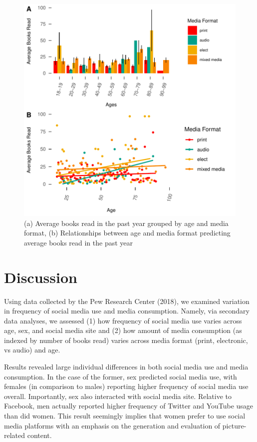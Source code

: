 \documentclass[man, fleqn, noextraspace]{apa6}
\theoremstyle{definition}
\theoremstyle{definition}
\theoremstyle{definition}
\theoremstyle{remark}
\begin{document}
\begin{figure}
\centering
\includegraphics{final_manuscript_files/figure-latex/fig4-1.pdf}
\caption{\label{fig:fig4}(a) Average books read in the past year grouped by
age and media format, (b) Relationships between age and media format
predicting average books read in the past year}
\end{figure}

\section{Discussion}\label{discussion}

Using data collected by the Pew Research Center (2018), we examined
variation in frequency of social media use and media consumption.
Namely, via secondary data analyses, we assessed (1) how frequency of
social media use varies across age, sex, and social media site and (2)
how amount of media consumption (as indexed by number of books read)
varies across media format (print, electronic, vs audio) and age.

Results revealed large individual differences in both social media use
and media consumption. In the case of the former, sex predicted social
media use, with females (in comparison to males) reporting higher
frequency of social media use overall. Importantly, sex also interacted
with social media site. Relative to Facebook, men actually reported
higher frequency of Twitter and YouTube usage than did women. This
result seemingly implies that women prefer to use social media platforms
with an emphasis on the generation and evaluation of picture-related
content.
\end{document}
